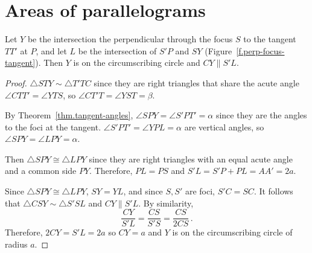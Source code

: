 
\section{Areas of parallelograms}

\begin{theorem}\label{thm.perp-tangent}
Let $Y$ be the intersection the perpendicular through the focus $S$ to the tangent $TT'$ at $P$, and let $L$ be the intersection of $S'P$ and $SY$ (Figure~\ref{f.perp-focus-tangent}). Then $Y$ is on the circumscribing circle and $CY\parallel S'L$.
\end{theorem}

\begin{proof}

$\triangle STY\sim\triangle T'TC$ since they are right triangles that share the acute angle $\angle CTT'=\angle YTS$, so $\angle CT'T=\angle YST=\beta$.

By Theorem~\ref{thm.tangent-angles}, $\angle SPY=\angle S'PT'=\alpha$ since they are the angles to the foci at the tangent. $\angle S'PT'=\angle YPL=\alpha$ are vertical angles, so $\angle SPY=\angle LPY=\alpha$. 

Then $\triangle SPY\cong\triangle LPY$ since they are right triangles with an equal acute angle and a common side $PY$. Therefore, $PL=PS$ and $S'L=S'P+PL=AA'=2a$.

Since $\triangle SPY\cong\triangle LPY$, $SY=YL$, and since $S,S'$ are foci, $S'C=SC$. It follows that $\triangle CSY\sim \triangle S'SL$ and $CY\parallel S'L$. By similarity,
\[
\frac{CY}{S'L}=\frac{CS}{S'S}=\frac{CS}{2CS}\,.
\]
Therefore, $2CY=S'L=2a$ so $CY=a$ and $Y$ is on the circumscribing circle of radius $a$.\hqed
\end{proof}


